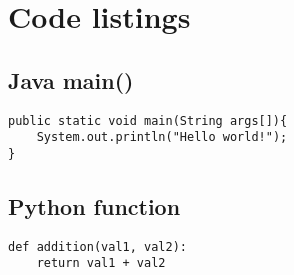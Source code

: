 \chapter{Code listings}
\label{AppendixC}

\section{Java main()}
\begin{lstlisting}[caption={Java main()}]
public static void main(String args[]){
	System.out.println("Hello world!");
}
\end{lstlisting}

\section{Python function}
\begin{lstlisting}[caption={Python function}]
def addition(val1, val2):
	return val1 + val2
\end{lstlisting}
